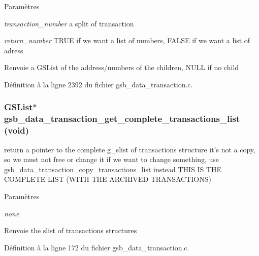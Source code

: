 \begin{DoxyParams}{Paramètres}
\item[{\em transaction\_\-number}]a split of transaction \item[{\em return\_\-number}]TRUE if we want a list of numbers, FALSE if we want a list of adress\end{DoxyParams}
\begin{DoxyReturn}{Renvoie}
a GSList of the address/numbers of the children, NULL if no child 
\end{DoxyReturn}


Définition à la ligne 2392 du fichier gsb\_\-data\_\-transaction.c.

\subsubsection[{gsb\_\-data\_\-transaction\_\-get\_\-complete\_\-transactions\_\-list}]{\setlength{\rightskip}{0pt plus 5cm}GSList$\ast$ gsb\_\-data\_\-transaction\_\-get\_\-complete\_\-transactions\_\-list (void)}\label{gsb__data__transaction_8h_aa54aeb205f29c2272154b2998fea490b}
return a pointer to the complete g\_\-slist of transactions structure it's not a copy, so we must not free or change it if we want to change something, use gsb\_\-data\_\-transaction\_\-copy\_\-transactions\_\-list instead THIS IS THE COMPLETE LIST (WITH THE ARCHIVED TRANSACTIONS)


\begin{DoxyParams}{Paramètres}
\item[{\em none}]\end{DoxyParams}
\begin{DoxyReturn}{Renvoie}
the slist of transactions structures 
\end{DoxyReturn}


Définition à la ligne 172 du fichier gsb\_\-data\_\-transaction.c.

